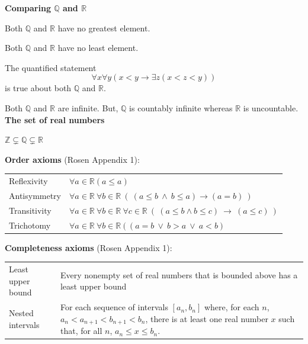 \documentclass[12pt, oneside]{article}
\begin{document}
{\bf Comparing $\mathbb{Q}$ and $\mathbb{R}$} 


Both $\mathbb{Q}$ and $\mathbb{R}$ have no greatest element.

Both $\mathbb{Q}$ and $\mathbb{R}$ have no least element.

The quantified statement 
\[
    \forall x \forall y (x < y \to \exists z ( x < z < y) )
\]
is true about both $\mathbb{Q}$ and $\mathbb{R}$.

Both $\mathbb{Q}$ and $\mathbb{R}$ are infinite. But, $\mathbb{Q}$ is countably infinite
whereas $\mathbb{R}$ is uncountable.\\


{\bf The set of real numbers}

$\mathbb{Z} \subsetneq \mathbb{Q} \subsetneq \mathbb{R}$


{\bf  Order axioms} (Rosen Appendix 1): 

\begin{center}
\begin{tabular}{p{1.2in}p{4in}}
Reflexivity &  $\forall a \in  \mathbb{R} (a \leq a)$\\
Antisymmetry &  $\forall a \in  \mathbb{R}~\forall b \in \mathbb{R}~(~(a \leq b~ \wedge ~b \leq a) \to (a=b)~)$\\
Transitivity &  $\forall a \in  \mathbb{R}~\forall b \in \mathbb{R}~\forall c \in \mathbb{R}~
(~(a \leq b \wedge b \leq c) ~\to  ~(a \leq c)~)$ \\
Trichotomy & 
$\forall a \in \mathbb{R}~\forall b \in \mathbb{R}~ ( ~(a=b ~\vee~ b > a ~\vee~ a  < b)  $
\end{tabular}
\end{center}


{\bf  Completeness axioms} (Rosen Appendix 1): 


\begin{center}
\begin{tabular}{p{1.4in}p{6in}}
Least upper bound &  Every nonempty set of real numbers that 
is bounded  above has  a  least upper bound  
\\
Nested intervals &  For each sequence  of intervals  $[a_n , b_n]$
where, for each $n$, $a_n < a_{n+1} < b_{n+1} < b_n$, there
is at least one  real number $x$ such that, for all $n$, 
$a_n \leq x \leq b_n$.\\
\end{tabular}
\end{center}
\end{document}
